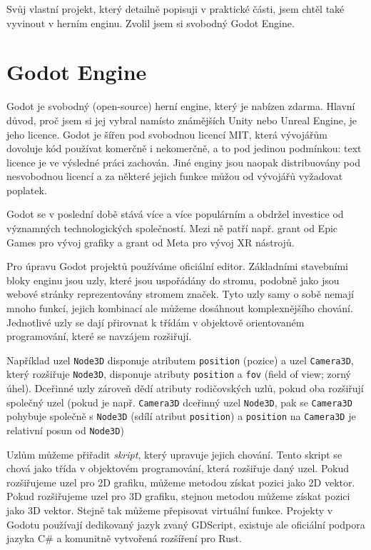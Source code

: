 Svůj vlastní projekt, který detailně popisuji v praktické části, jsem chtěl také vyvinout v herním enginu. Zvolil jsem si svobodný Godot Engine.

\section{Godot Engine}

Godot je svobodný (open-source) herní engine, který je nabízen zdarma. Hlavní důvod, proč jsem si jej vybral namísto známějších Unity nebo Unreal Engine, je jeho licence. Godot je šířen pod svobodnou licencí MIT, která vývojářům dovoluje kód používat komerčně i nekomerčně, a to pod jedinou podmínkou: text licence je ve výsledné práci zachován. Jiné enginy jsou naopak distribuovány pod nesvobodnou licencí a za některé jejich funkce můžou od vývojářů vyžadovat poplatek.

Godot se v poslední době stává více a více populárním a obdržel investice od významných technologických společností. Mezi ně patří např. grant od Epic Games pro vývoj grafiky a grant od Meta pro vývoj XR nástrojů. \cite{godot_epicgames} \cite{godot_meta}

Pro úpravu Godot projektů používáme oficiální editor. Základními stavebními bloky enginu jsou uzly, které jsou uspořádány do stromu, podobně jako jsou webové stránky reprezentovány stromem značek. Tyto uzly samy o sobě nemají mnoho funkcí, jejich kombinací ale můžeme dosáhnout komplexnějšího chování. Jednotlivé uzly se dají přirovnat k třídám v objektově orientovaném programování, které se navzájem rozšiřují.

Například uzel \texttt{Node3D} disponuje atributem \texttt{position} (pozice) a uzel \texttt{Camera3D}, který rozšiřuje \texttt{Node3D}, disponuje atributy \texttt{position} a \texttt{fov} (field of view; zorný úhel). Dceřinné uzly zároveň dědí atributy rodičovských uzlů, pokud oba rozšiřují společný uzel (pokud je např. \texttt{Camera3D} dceřinný uzel \texttt{Node3D}, pak se \texttt{Camera3D} pohybuje společně s \texttt{Node3D} (sdílí atribut \texttt{position}) a \texttt{position} na \texttt{Camera3D} je relativní posun od \texttt{Node3D})

Uzlům můžeme přiřadit \textit{skript}, který upravuje jejich chování. Tento skript se chová jako třída v objektovém programování, která rozšiřuje daný uzel. Pokud rozšiřujeme uzel pro 2D grafiku, můžeme metodou získat pozici jako 2D vektor. Pokud rozšiřujeme uzel pro 3D grafiku, stejnou metodou můžeme získat pozici jako 3D vektor. Stejně tak můžeme přepisovat virtuální funkce. Projekty v Godotu používají dedikovaný jazyk zvaný GDScript, existuje ale oficiální podpora jazyka C\# a komunitně vytvořená rozšíření pro Rust.

